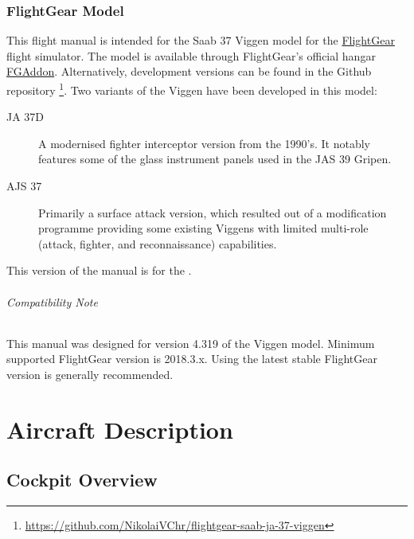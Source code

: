 \documentclass[a4paper]{report}
\newcommand{\variant}{\ifbool{AJS}{AJS 37}{JA 37D}}
\newcommand{\versionnumber}{4.319}
\begin{document}
\section*{FlightGear Model}
This flight manual is intended for the Saab 37 Viggen model
for the \href{http://www.flightgear.org}{FlightGear} flight simulator.
The model is available through FlightGear's official hangar
\href{http://wiki.flightgear.org/FGAddon}{FGAddon}.
Alternatively, development versions can be found in the Github repository%
\footnote{\url{https://github.com/NikolaiVChr/flightgear-saab-ja-37-viggen}}.
Two variants of the Viggen have been developed in this model:
\begin{description}
  \item[JA 37D] A modernised fighter interceptor version from the 1990's.
    It notably features some of the glass instrument panels used in the JAS 39 Gripen.
  \item[AJS 37] Primarily a surface attack version,
    which resulted out of a modification programme providing some existing Viggens
    with limited multi-role (attack, fighter, and reconnaissance) capabilities.
\end{description}
This version of the manual is for the \variant{}.

\paragraph*{Compatibility Note}
This manual was designed for version \versionnumber{} of the Viggen model.
Minimum supported FlightGear version is 2018.3.x.
Using the latest stable FlightGear version is generally recommended.


\part{Aircraft Description}
\chapter{Cockpit Overview}
\end{document}

